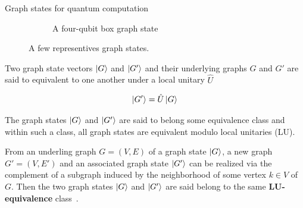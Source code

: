 \documentclass[final]{beamer}
\newlength{\colwidth}
\begin{document}
\begin{frame}[t]
\begin{columns}[t]
\begin{column}{\colwidth}
\begin{block}{Graph states for quantum computation}
\begin{figure}[H]
\begin{subfigure}[b]{0.40\textwidth}
                            \label{fig:linear_cluster_4q}
                        \end{subfigure}
                        \begin{subfigure}[b]{0.40\textwidth}
                            \centering
                            \caption{A four-qubit box graph state}
                            \label{fig:box_cluster_4q}
                        \end{subfigure}
                        \caption{A few representives graph states. }
                        \label{fig:graph_states}
                    \end{figure}

                    Two graph state vectors $\ket{G}$ and $\ket{G'}$  and their
                    underlying graphs $G$ and  $G'$ are said to
                    equivalent to one another under a local unitary $\hat{U}$ 

                    \begin{align}
                        \ket{G'} = \hat{U}\ket{G}
                        \label{eq:graph_state_unitary_equivalence}
                    \end{align}

                    The graph states $\ket{G}$ and  $\ket{G'}$ are said to belong some
                    equivalence class and within such a class, all graph states are
                    equivalent modulo local unitaries (LU). 


                    From an underling graph $G = (V, E)$ of a graph state $\ket{G}$, a new
                    graph $G' = (V, E')$ and an associated graph state $\ket{G'}$ can be
                    realized via the complement of a subgraph induced by the neighborhood of some vertex $k
                    \in V$ of $G$. Then the two graph states $\ket{G}$ and $\ket{G'}$ are said belong to the same
                    \textbf{LU-equivalence} class~\cite{PhysRevA.69.062311}.
                \end{block}
            \end{column}


\end{columns}
\end{frame}
\end{document}
